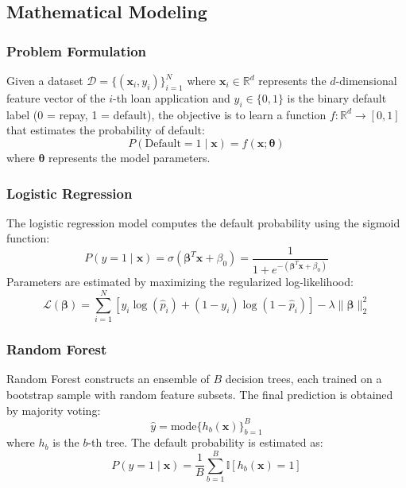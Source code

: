 \documentclass[runningheads]{llncs}
\begin{document}
\subsection{Mathematical Modeling}

\subsubsection{Problem Formulation}
Given a dataset $\mathcal{D} = \{(\mathbf{x}_i, y_i)\}_{i=1}^{N}$ where $\mathbf{x}_i \in \mathbb{R}^d$ represents the $d$-dimensional feature vector of the $i$-th loan application and $y_i \in \{0, 1\}$ is the binary default label (0 = repay, 1 = default), the objective is to learn a function $f: \mathbb{R}^d \rightarrow [0, 1]$ that estimates the probability of default:
\begin{equation}
    P(\text{Default} = 1 \mid \mathbf{x}) = f(\mathbf{x}; \boldsymbol{\theta})
\end{equation}
where $\boldsymbol{\theta}$ represents the model parameters.

\subsubsection{Logistic Regression}
The logistic regression model computes the default probability using the sigmoid function:
\begin{equation}
    P(y = 1 \mid \mathbf{x}) = \sigma(\boldsymbol{\beta}^T \mathbf{x} + \beta_0) = \frac{1}{1 + e^{-(\boldsymbol{\beta}^T \mathbf{x} + \beta_0)}}
\end{equation}
Parameters are estimated by maximizing the regularized log-likelihood:
\begin{equation}
    \mathcal{L}(\boldsymbol{\beta}) = \sum_{i=1}^{N} \left[ y_i \log(\hat{p}_i) + (1 - y_i) \log(1 - \hat{p}_i) \right] - \lambda \|\boldsymbol{\beta}\|_2^2
\end{equation}

\subsubsection{Random Forest}
Random Forest constructs an ensemble of $B$ decision trees, each trained on a bootstrap sample with random feature subsets. The final prediction is obtained by majority voting:
\begin{equation}
    \hat{y} = \text{mode}\{h_b(\mathbf{x})\}_{b=1}^{B}
\end{equation}
where $h_b$ is the $b$-th tree. The default probability is estimated as:
\begin{equation}
    P(y = 1 \mid \mathbf{x}) = \frac{1}{B} \sum_{b=1}^{B} \mathbb{I}[h_b(\mathbf{x}) = 1]
\end{equation}
\end{document}
